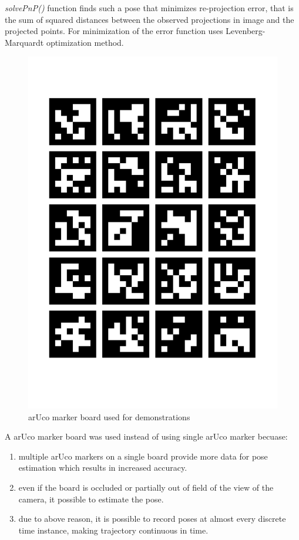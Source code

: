 \textit{solvePnP()} function finds such a pose that minimizes re-projection error, that is the sum of squared distances between the observed projections in image and the projected points. For minimization of the error function uses Levenberg-Marquardt optimization method. 

\begin{figure}[H]
	\centering
	\includegraphics[scale=0.3]{images/aruco_marker_board.pdf}
	\caption{arUco marker board used for demonstrations}
	\label{fig:aruco_marker_board}
\end{figure}

A arUco marker board was used instead of using single arUco marker becuase:\\
\begin{enumerate}
	\item multiple arUco markers on a single board provide more data for pose estimation which results in increased accuracy. 
	\item even if the board is occluded or partially out of field of the view of the camera, it possible to estimate the pose.
	\item due to above reason, it is possible to record poses at almost every discrete time instance, making trajectory continuous in time.
	  
\end{enumerate}
	
